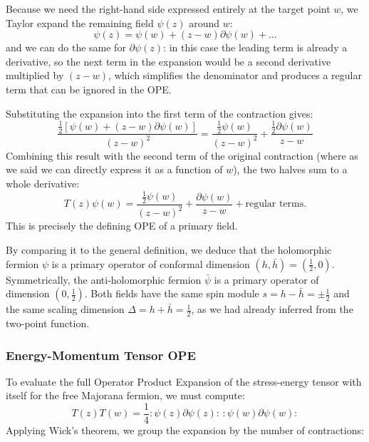 Because we need the right-hand side expressed entirely at the target point \(w\), we Taylor expand the remaining field \(\psi(z)\) around \(w\):
\[
    \psi(z) = \psi(w) + (z-w)\partial\psi(w) + \dots
\]
and we can do the same for \(\partial\psi(z)\): in this case the leading term is already a derivative, so the next term in the expansion would be a second derivative multiplied by \((z-w)\), which simplifies the denominator and produces a regular term that can be ignored in the OPE.

Substituting the expansion into the first term of the contraction gives:
\[
    \frac{\frac{1}{2} [\psi(w) + (z-w)\partial\psi(w)]}{(z-w)^2} = \frac{\frac{1}{2}\psi(w)}{(z-w)^2} + \frac{\frac{1}{2}\partial\psi(w)}{z-w}
\]
Combining this result with the second term of the original contraction (where as we said we can directly express it as a function of \(w\)), the two halves sum to a whole derivative:
\[
    T(z)\psi(w) = \frac{\frac{1}{2}\psi(w)}{(z-w)^2} + \frac{\partial\psi(w)}{z-w} + \text{regular terms.}
\]
This is precisely the defining OPE of a primary field.

By comparing it to the general definition, we deduce that the holomorphic fermion \(\psi\) is a primary operator of conformal dimension \((h, \bar{h}) = (\frac{1}{2}, 0)\). Symmetrically, the anti-holomorphic fermion \(\bar{\psi}\) is a primary operator of dimension \((0, \frac{1}{2})\). Both fields have the same spin module \(s = h - \bar{h} = \pm \frac{1}{2}\) and the same scaling dimension \(\Delta = h + \bar{h} = \frac{1}{2}\), as we had already inferred from the two-point function.

\subsubsection{Energy-Momentum Tensor OPE}

To evaluate the full Operator Product Expansion of the stress-energy tensor with itself for the free Majorana fermion, we must compute:
\[
    T(z)T(w) = \frac{1}{4} :\psi(z)\partial\psi(z): \, :\psi(w)\partial\psi(w):
\]
Applying Wick's theorem, we group the expansion by the number of contractions:

